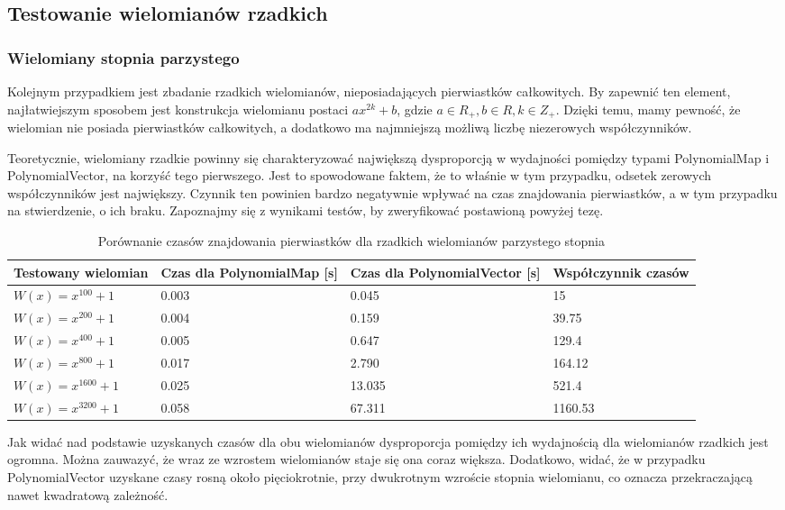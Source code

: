 \subsection{Testowanie wielomianów rzadkich}

\subsubsection{Wielomiany stopnia parzystego}

Kolejnym przypadkiem jest zbadanie rzadkich wielomianów, nieposiadających pierwiastków całkowitych. By zapewnić ten element, najłatwiejszym sposobem jest konstrukcja wielomianu postaci $ax^{2k}+b$, gdzie $a \in R_+, b \in R, k \in Z_+$. Dzięki temu, mamy pewność, że wielomian nie posiada pierwiastków całkowitych, a dodatkowo ma najmniejszą możliwą liczbę niezerowych współczynników.

Teoretycznie, wielomiany rzadkie powinny się charakteryzować największą dysproporcją w wydajności pomiędzy typami PolynomialMap i PolynomialVector, na korzyść tego pierwszego. Jest to spowodowane faktem, że to właśnie w tym przypadku, odsetek zerowych współczynników jest największy. Czynnik ten powinien bardzo negatywnie wpływać na czas znajdowania pierwiastków, a w tym przypadku na stwierdzenie, o ich braku. Zapoznajmy się z wynikami testów, by zweryfikować postawioną powyżej tezę.

\begin{table}[H]
	\begin{tabular}{ |p{3.5cm}|p{3cm}|p{3cm}|p{3.5cm}|} 
		\hline
		Testowany wielomian & Czas dla PolynomialMap [s] & Czas dla PolynomialVector [s] & Współczynnik czasów \\
		\hline
		$W(x) = x^{100} + 1$ & 0.003 & 0.045 & 15 \\
		$W(x) = x^{200} + 1$ & 0.004 & 0.159 & 39.75 \\
		$W(x) = x^{400} + 1$ & 0.005 & 0.647 & 129.4 \\
		$W(x) = x^{800} + 1$ & 0.017 & 2.790 & 164.12 \\
		$W(x) = x^{1600} + 1$ & 0.025 & 13.035 & 521.4 \\
		$W(x) = x^{3200} + 1$ & 0.058 & 67.311 & 1160.53 \\
		\hline
	\end{tabular}
	\caption{Porównanie czasów znajdowania pierwiastków dla rzadkich wielomianów parzystego stopnia}
\end{table}

Jak widać nad podstawie uzyskanych czasów dla obu wielomianów dysproporcja pomiędzy ich wydajnością dla wielomianów rzadkich jest ogromna. Można zauwazyć, że wraz ze wzrostem wielomianów staje się ona coraz większa. Dodatkowo, widać, że w przypadku PolynomialVector uzyskane czasy rosną około pięciokrotnie, przy dwukrotnym wzroście stopnia wielomianu, co oznacza przekraczającą nawet kwadratową zależność.

